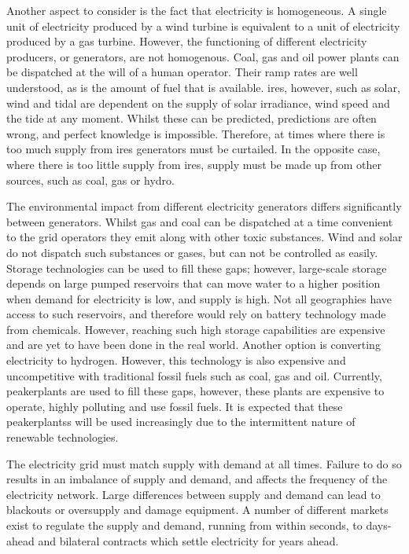 Another aspect to consider is the fact that electricity is homogeneous. A single unit of electricity produced by a wind turbine is equivalent to a unit of electricity produced by a gas turbine. However, the functioning of different electricity producers, or generators, are not homogenous. Coal, gas and oil power plants can be \gls{dispatched} at the will of a human operator. Their ramp rates are well understood, as is the amount of fuel that is available. \Gls{ires}, however, such as solar, wind and tidal are dependent on the supply of solar irradiance, wind speed and the tide at any moment. Whilst these can be predicted, predictions are often wrong, and perfect knowledge is impossible. Therefore, at times where there is too much supply from \acrfull{ires} generators must be curtailed. In the opposite case, where there is too little supply from \acrshort{ires}, supply must be made up from other sources, such as coal, gas or hydro.

The environmental impact from different electricity generators differs significantly between generators. Whilst gas and coal can be dispatched at a time convenient to the grid operators they emit  along with other toxic substances. Wind and solar do not dispatch such substances or gases, but can not be controlled as easily. Storage technologies can be used to fill these gaps; however, large-scale storage depends on large pumped reservoirs that can move water to a higher position when demand for electricity is low, and supply is high. Not all geographies have access to such reservoirs, and therefore would rely on battery technology made from chemicals. However, reaching such high storage capabilities are expensive and are yet to have been done in the real world. Another option is converting electricity to hydrogen. However, this technology is also expensive and uncompetitive with traditional fossil fuels such as coal, gas and oil. Currently, \gls{peakerplants} are used to fill these gaps, however, these plants are expensive to operate, highly polluting and use fossil fuels. It is expected that these \gls{peakerplants}s will be used increasingly due to the intermittent nature of renewable technologies. 


The electricity grid must match supply with demand at all times. Failure to do so results in an imbalance of supply and demand, and affects the frequency of the electricity network. Large differences between supply and demand can lead to blackouts or oversupply and damage equipment. A number of different markets exist to regulate the supply and demand, running from within seconds, to days-ahead and bilateral contracts which settle electricity for years ahead.

